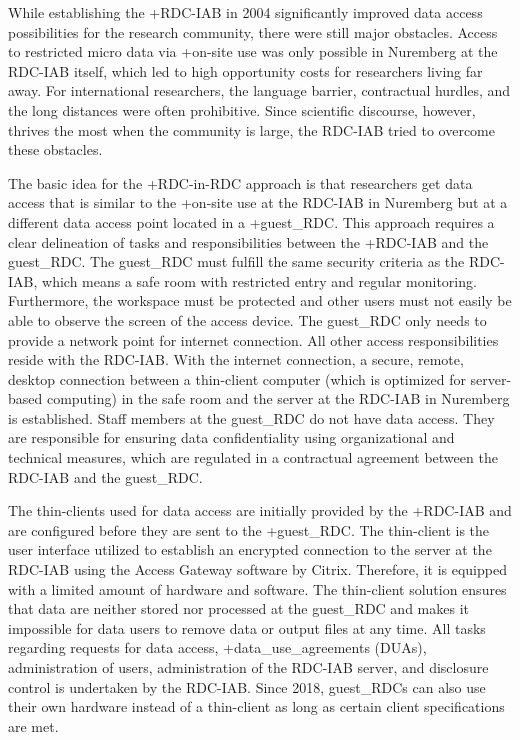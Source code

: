 \documentclass[
]{book}
\begin{document}
While establishing the +RDC-IAB\textbar{} in 2004 significantly improved data access possibilities for the research community, there were still major obstacles. Access to restricted micro data via +on-site\textbar{} use was only possible in Nuremberg at the RDC-IAB itself, which led to high opportunity costs for researchers living far away. For international researchers, the language barrier, contractual hurdles, and the long distances were often prohibitive. Since scientific discourse, however, thrives the most when the community is large, the RDC-IAB tried to overcome these obstacles.

The basic idea for the +RDC-in-RDC\textbar{} approach is that researchers get data access that is similar to the +on-site\textbar{} use at the RDC-IAB in Nuremberg but at a different data access point located in a +guest\_RDC\textbar. This approach requires a clear delineation of tasks and responsibilities between the +RDC-IAB\textbar{} and the guest\_RDC. The guest\_RDC must fulfill the same security criteria as the RDC-IAB, which means a safe room with restricted entry and regular monitoring. Furthermore, the workspace must be protected and other users must not easily be able to observe the screen of the access device. The guest\_RDC only needs to provide a network point for internet connection. All other access responsibilities reside with the RDC-IAB. With the internet connection, a secure, remote, desktop connection between a thin-client computer (which is optimized for server-based computing) in the safe room and the server at the RDC-IAB in Nuremberg is established. Staff members at the guest\_RDC do not have data access. They are responsible for ensuring data confidentiality using organizational and technical measures, which are regulated in a contractual agreement between the RDC-IAB and the guest\_RDC.

The thin-clients used for data access are initially provided by the +RDC-IAB\textbar{} and are configured before they are sent to the +guest\_RDC\textbar. The thin-client is the user interface utilized to establish an encrypted connection to the server at the RDC-IAB using the Access Gateway software by Citrix. Therefore, it is equipped with a limited amount of hardware and software. The thin-client solution ensures that data are neither stored nor processed at the guest\_RDC and makes it impossible for data users to remove data or output files at any time. All tasks regarding requests for data access, +data\_use\_agreements\textbar{} (DUAs), administration of users, administration of the RDC-IAB server, and disclosure control is undertaken by the RDC-IAB. Since 2018, guest\_RDCs can also use their own hardware instead of a thin-client as long as certain client specifications are met.
\end{document}
